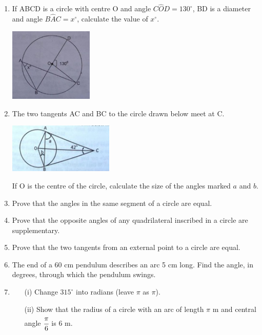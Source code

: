 \begin{enumerate}
	\item If ABCD is a circle with centre O and angle $C\hat{O}D = 130^\circ$, BD is a diameter and angle $B\hat{A}C = x^\circ$, calculate the value of $x^\circ$.
	\begin{center}
	\includegraphics[width=4cm]{./img/circ15.jpg}
	\end{center}
	
	\item The two tangents AC and BC to the circle drawn below meet at C.
	\begin{center}
	\includegraphics[width=5cm]{./img/circ16.jpg}
	\end{center}
	If O is the centre of the circle, calculate the size of the angles marked $a$ and $b$.
	
	\item Prove that the angles in the same segment of a circle are equal.
	
	\item Prove that the opposite angles of any quadrilateral inscribed in a circle are supplementary.
	
	\item Prove that the two tangents from an external point to a circle are equal.
	
	\item The end of a 60 cm pendulum describes an arc 5 cm long. Find the angle, in degrees, through which the pendulum swings.
	
	\item 
		\begin{itemize}
		\item[(i)] Change $315^\circ$ into radians (leave $\pi$ as $\pi$).
		\item[(ii)] Show that the radius of a circle with an arc of length $\pi$ m and central angle $\cfrac{\pi}{6}$ is 6 m.
		\end{itemize}
		

\end{enumerate}

